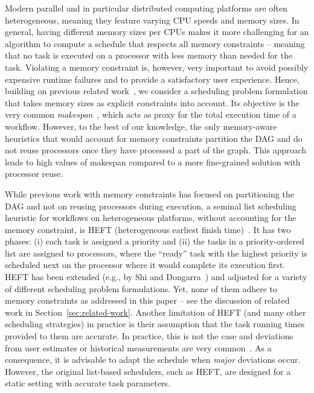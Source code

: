 \documentclass[conference]{IEEEtran}
\newcommand{\skug}[1]{{\color{blue}[SK: #1]}}
\newcommand{\hmey}[1]{{\color{red}[HM: #1]}}
\newcommand{\AB}[1]{{\color{purple}[AB: #1]}}
\begin{document}
Modern parallel and in particular distributed computing platforms are often heterogeneous,
meaning they feature varying CPU speeds and memory sizes. 
In general, having different memory sizes per CPUs makes it more challenging for an algorithm 
to compute a schedule that respects all memory constraints -- meaning that no task is executed on a 
processor with less memory than needed for the task. Violating a memory constraint is, however, 
very important to avoid possibly expensive runtime failures and to provide a satisfactory user experience.
Hence, building on previous related %
work~\cite{gou2020partitioning,He21,DBLP:conf/icpp/KulaginaMB24}, we consider a scheduling problem 
formulation that takes memory sizes as explicit constraints into account. 
Its objective is the very common \emph{makespan}~\cite{liu2018survey}, 
which acts as proxy for the total execution time of a workflow.
However, to the best of our knowledge, the only memory-aware heuristics that would account for 
memory constraints partition the DAG and do not reuse processors once they have processed a part
of the graph. This approach leads to high values of makespan compared to a more fine-grained solution
with processor reuse. 

While previous work with memory constraints has focused on partitioning the DAG and not on 
reusing processors during execution, a seminal list scheduling heuristic for workflows on 
heterogeneous platforms, without accounting for the memory constraint, is HEFT 
(heterogeneous earliest finish time)~\cite{topcuoglu2002performance}.
It has two phases: (i) each task is assigned a priority and (ii) the tasks in a priority-ordered list are assigned
to processors, where the ``ready'' task with the highest priority is scheduled next on the processor
where it would complete its execution first. 
HEFT has been extended (e.g., by Shi and Dongarra~\cite{SHI2006665}) and adjusted 
for a variety of different scheduling problem formulations. 
Yet, none of them adhere to memory constraints as addressed in this paper -- 
see the discussion of related work in Section~\ref{sec:related-work}. 
%    
Another limitation of HEFT (and many other scheduling strategies) in practice is their 
assumption that the task running times provided to them are accurate. In practice, this is 
not the case and deviations from user estimates or historical measurements are 
very common~\cite{hirales2012multiple}. As a consequence, it is advisable to adapt the schedule when \emph{major}
deviations occur. However, the original list-based schedulers, such as HEFT, are designed
for a static setting with accurate task parameters. 
%    
\end{document}
